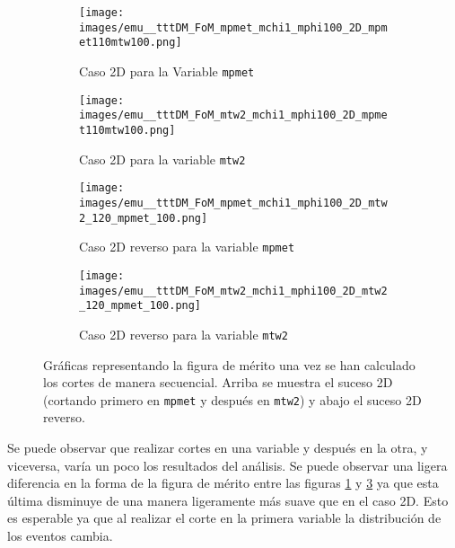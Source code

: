 \begin{figure}[h!]
     \centering
     \begin{subfigure}[b]{0.43\textwidth}
         \centering
         \texttt{[image: images/emu\_\_tttDM\_FoM\_mpmet\_mchi1\_mphi100\_2D\_mpmet110mtw100.png]}
         \caption{Caso 2D para la Variable \texttt{mpmet}}
         \label{fig:FoM_2D_mpmet_110_mtw2_100_mpmet}
     \end{subfigure}
     \begin{subfigure}[b]{0.43\textwidth}
         \centering
         \texttt{[image: images/emu\_\_tttDM\_FoM\_mtw2\_mchi1\_mphi100\_2D\_mpmet110mtw100.png]}
         \caption{Caso 2D para la variable \texttt{mtw2}}
         \label{fig:FoM_2D_mpmet_110_mtw2_100_mtw2}
     \end{subfigure}
     \hfill
          \begin{subfigure}[b]{0.43\textwidth}
         \centering
         \texttt{[image: images/emu\_\_tttDM\_FoM\_mpmet\_mchi1\_mphi100\_2D\_mtw2\_120\_mpmet\_100.png]}
         \caption{Caso 2D reverso para la variable \texttt{mpmet}}
         \label{fig:FoM_2D_mtw2_120_mpmet_100_mpmet}
     \end{subfigure}
          \begin{subfigure}[b]{0.43\textwidth}
         \centering
         \texttt{[image: images/emu\_\_tttDM\_FoM\_mtw2\_mchi1\_mphi100\_2D\_mtw2\_120\_mpmet\_100.png]}
         \caption{Caso 2D reverso para la variable \texttt{mtw2}}
         \label{fig:FoM_2D_mtw2_120_mpmet_100_mtw2}
     \end{subfigure}
     \caption{Gráficas representando la figura de mérito una vez se han calculado los cortes de manera secuencial. Arriba se muestra el suceso 2D (cortando primero en \texttt{mpmet} y después en \texttt{mtw2}) y abajo el suceso 2D reverso.}
     \label{fig:FoM_2D}
\end{figure}

Se puede observar que realizar cortes en una variable y después en la otra, y viceversa, varía un poco los resultados del análisis. Se puede observar una ligera diferencia en la forma de la figura de mérito entre las figuras \ref{fig:FoM_2D_mpmet_110_mtw2_100_mpmet} y \ref{fig:FoM_2D_mtw2_120_mpmet_100_mpmet} ya que esta última disminuye de una manera ligeramente más suave que en el caso 2D. Esto es esperable ya que al realizar el corte en la primera variable la distribución de los eventos cambia.\\
